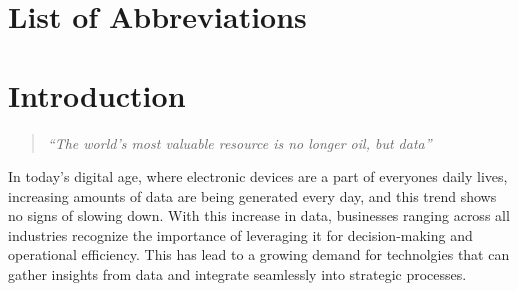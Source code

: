 \documentclass[a4paper,12pt,twoside]{scrreprt}
\begin{document}


\cleardoublepage   %
\tableofcontents

\clearpage
{}
{}
\listoffigures

\clearpage
{}
{}
\listoftables

\clearpage
{}
{}
\chapter*{List of Abbreviations}
\begin{acronym}[WGS84]
\end{acronym}

\chapter{Introduction}

\begin{quote}
  \textit{``The world's most valuable resource is no longer oil, but data''}
  \cite{noauthor_worlds_nodate}
\end{quote}
In today's digital age, where electronic devices are a part of everyones daily
lives, increasing amounts of data
are being generated every day, and this trend shows no signs of slowing down.
\cite{petroc_data_nodate}
With this increase in data, businesses ranging across all industries recognize
the importance of leveraging it for decision-making and operational efficiency.
This has lead to a growing demand for technolgies that can gather insights from
data and integrate seamlessly into strategic processes.
\end{document}
